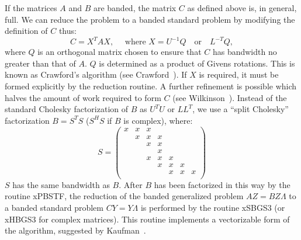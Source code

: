 If the matrices $A$ and $B$ are banded,
the matrix $C$ as defined above is, in general, full.
We can reduce the problem to a banded standard problem by modifying the
definition of $C$ thus:
\[
C = X^T A X, \quad \mbox{ where } X = U^{-1} Q \quad \mbox{or} \quad L^{-T} Q,
\]
where $Q$ is an orthogonal matrix chosen to ensure that $C$ has bandwidth
no greater than that of $A$.
$Q$ is determined as a product of Givens rotations.
This is known as Crawford's algorithm
(see Crawford~\cite{crawford}).
If $X$ is required, it must be formed explicitly by the reduction routine.
A further refinement is possible which halves
the amount of work required to form $C$ (see Wilkinson~\cite{wilkinsona}).
Instead of the standard Cholesky factorization of $B$ as $U^T U$ or $L L^T$,
we use a ``split Cholesky'' factorization $B = S^T S$
($S^H S$ if $B$ is complex), where:
\[
S = \left( \begin{array}{ccccccc}
x & x & x &    &    &    &    \\
   & x & x & x &    &    &    \\
   &    & x & x &    &    &    \\
   &    &    & x &    &    &    \\
   &    & x & x & x &    &    \\
   &    &    & x & x & x &    \\
   &    &    &    & x & x & x \\
\end{array} \right)
\]
$S$ has the same bandwidth as $B$. After $B$ has been factorized in this way
by the routine
xPBSTF,
the reduction of the banded generalized
problem $A Z = B Z \Lambda $ to a banded standard problem $C Y = Y \Lambda$
is performed by the routine xSBGS3
(or xHBGS3 for complex matrices).
This routine implements a vectorizable form of the algorithm, suggested by
Kaufman~\cite{vbandr}.

